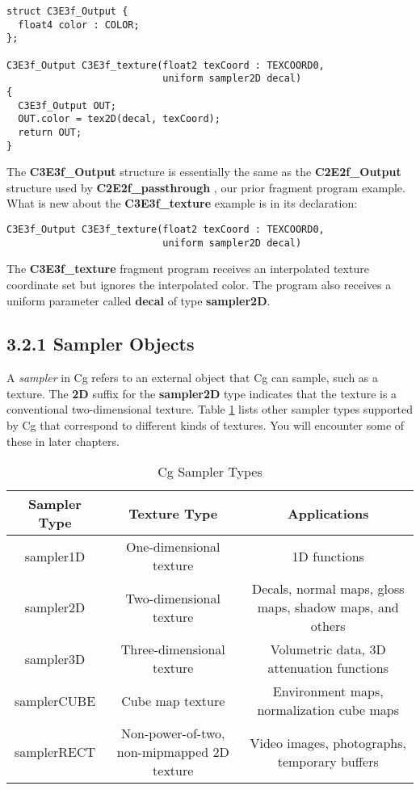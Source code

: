 \documentclass[../main.tex]{subfiles}
\begin{document}
\FloatBarrier
\begin{lstlisting}[caption=Example 3-3. The \textbf{C3E3f_texture} Fragment Program]
struct C3E3f_Output {
  float4 color : COLOR;
};

C3E3f_Output C3E3f_texture(float2 texCoord : TEXCOORD0,
                           uniform sampler2D decal)
{
  C3E3f_Output OUT;
  OUT.color = tex2D(decal, texCoord);
  return OUT;
}
\end{lstlisting}
\FloatBarrier

The \textbf{C3E3f_Output} structure is essentially the same as the \textbf{C2E2f_Output} structure used by \textbf{C2E2f_passthrough} , our prior fragment program example. What is new about the \textbf{C3E3f_texture} example is in its declaration:

\FloatBarrier
\begin{lstlisting}
C3E3f_Output C3E3f_texture(float2 texCoord : TEXCOORD0,
                           uniform sampler2D decal)
\end{lstlisting}
\FloatBarrier

The \textbf{C3E3f_texture} fragment program receives an interpolated texture coordinate set but ignores the interpolated color. The program also receives a uniform parameter called \textbf{decal} of type \textbf{sampler2D}.

\subsection{3.2.1 Sampler Objects}

A \textit{sampler} in Cg refers to an external object that Cg can sample, such as a texture. The \textbf{2D} suffix for the \textbf{sampler2D} type indicates that the texture is a conventional two-dimensional texture. Table \ref{table:3-1} lists other sampler types supported by Cg that correspond to different kinds of textures. You will encounter some of these in later chapters.

\begin{table}
\centering
\begin{tabular}{ |c|c|c| } 
 \hline
Sampler Type & Texture Type & Applications \\
\hline
sampler1D & One-dimensional texture & 1D functions \\
sampler2D & Two-dimensional texture & Decals, normal maps, gloss maps, shadow maps, and others \\
sampler3D & Three-dimensional texture & Volumetric data, 3D attenuation functions \\
samplerCUBE & Cube map texture & Environment maps, normalization cube maps \\
samplerRECT & Non-power-of-two, non-mipmapped 2D texture & Video images, photographs, temporary buffers \\
 \hline
\end{tabular}
\caption{Cg Sampler Types}
\label{table:3-1}
\end{table}
\end{document}
